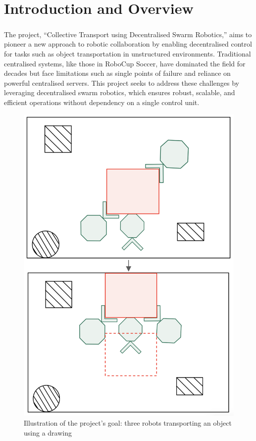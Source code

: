 \chapter{Introduction and Overview}

\paragraph*{}
The project, “Collective Transport using Decentralised Swarm Robotics,” aims to pioneer a new approach to robotic collaboration by enabling decentralised control for tasks such as object transportation in unstructured environments. Traditional centralised systems, like those in RoboCup Soccer, have dominated the field for decades but face limitations such as single points of failure and reliance on powerful centralised servers. This project seeks to address these challenges by leveraging decentralised swarm robotics, which ensures robust, scalable, and efficient operations without dependency on a single control unit.

\begin{figure} [H]
    \centering
    \includegraphics[width=0.75\linewidth]{assets/images/introduction/robot-transport-draw.png}
    \caption{Illustration of the project's goal: three robots transporting an object using a drawing}
    \label{fig:robot-transport-draw}
\end{figure}

